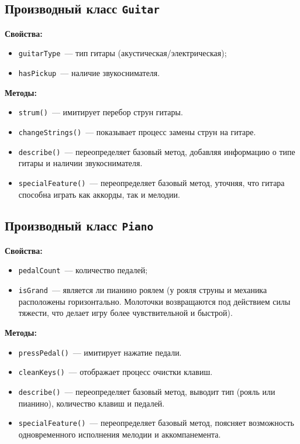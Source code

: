 \documentclass[14pt]{extarticle}
\begin{document}
\subsection*{Производный класс \texttt{Guitar}}

\textbf{Свойства:}

\begin{itemize}
\item \texttt{guitarType}~--- тип гитары (акустическая/электрическая);
\item \texttt{hasPickup}~--- наличие звукоснимателя.
\end{itemize}

\textbf{Методы:}

\begin{itemize}
    \item \texttt{strum()}~--- имитирует перебор струн гитары.
    \item \texttt{changeStrings()}~--- показывает процесс замены струн на гитаре.
    \item \texttt{describe()}~--- переопределяет базовый метод, добавляя информацию о типе гитары и наличии звукоснимателя.
    \item \texttt{specialFeature()}~--- переопределяет базовый метод, уточняя, что гитара способна играть как аккорды, так и мелодии.
\end{itemize}

\subsection*{Производный класс \texttt{Piano}}

\textbf{Свойства:}

\begin{itemize}
\item \texttt{pedalCount}~--- количество педалей;
\item \texttt{isGrand}~--- является ли пианино роялем (у рояля струны и механика расположены горизонтально. Молоточки возвращаются под действием силы тяжести, что делает игру более чувствительной и быстрой). 
\end{itemize}

\textbf{Методы:}

\begin{itemize}
    \item \texttt{pressPedal()}~--- имитирует нажатие педали.
    \item \texttt{cleanKeys()}~--- отображает процесс очистки клавиш.
    \item \texttt{describe()}~--- переопределяет базовый метод, выводит тип (рояль или пианино), количество клавиш и педалей.
    \item \texttt{specialFeature()}~--- переопределяет базовый метод, поясняет возможность одновременного исполнения мелодии и аккомпанемента.
\end{itemize}
\end{document}
